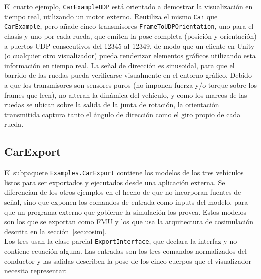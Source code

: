El cuarto ejemplo, \verb|CarExampleUDP| está orientado a demostrar la visualización en tiempo real, utilizando un motor externo. Reutiliza el mismo \verb|Car| que \verb|CarExample|, pero añade cinco transmisores \verb|FrameToUDPOrientation|, uno para el chasis y uno por cada rueda, que emiten la pose completa (posición y orientación) a puertos UDP consecutivos del 12345 al 12349, de modo que un cliente en Unity (o cualquier otro visualizador) pueda renderizar elementos gráficos utilizando esta información en tiempo real. La señal de dirección es sinusoidal, para que el barrido de las ruedas pueda verificarse visualmente en el entorno gráfico. Debido a que los transmisores son sensores puros (no imponen fuerza y/o torque sobre los frames que leen), no alteran la dinámica del vehículo, y como los marcos de las ruedas se ubican sobre la salida de la junta de rotación, la orientación transmitida captura tanto el ángulo de dirección como el giro propio de cada rueda.\\


\subsection{CarExport}

El subpaquete \verb|Examples.CarExport| contiene los modelos de los tres vehículos listos para ser exportados y ejecutados desde una aplicación externa. Se diferencian de los otros ejemplos en el hecho de que no incorporan fuentes de señal, sino que exponen los comandos de entrada como inputs del modelo, para que un programa externo que gobierne la simulación los provea. Estos modelos son los que se exportan como FMU y los que usa la arquitectura de cosimulación descrita en la sección~\ref{sec:cosim}.\\

Los tres usan la clase parcial \verb|ExportInterface|, que declara la interfaz y no contiene ecuación alguna. Las entradas son los tres comandos normalizados del conductor y las salidas describen la pose de los cinco cuerpos que el visualizador necesita representar:

